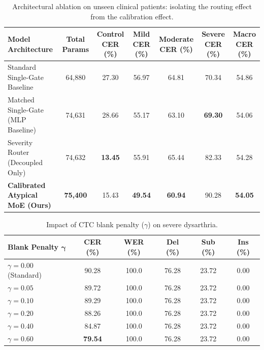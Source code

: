 \documentclass[10pt,twocolumn]{article}
\makeatletter
\newenvironment{adjustbox}[1]{%
  \begin{lrbox}{\@adjbox}%
}{%
  \end{lrbox}%
  \resizebox{\linewidth}{!}{\usebox{\@adjbox}}%
}
\makeatother
\begin{document}
\begin{table}[!t]
\centering
\caption{Architectural ablation on unseen clinical patients: isolating the routing effect from the calibration effect.}
\label{tab:arch_ablation}
\begin{adjustbox}{width=\textwidth}
\begin{tabular}{lcccccc}
\toprule
\textbf{Model Architecture} & \textbf{Total Params} & \textbf{Control CER (\%)} & \textbf{Mild CER (\%)} & \textbf{Moderate CER (\%)} & \textbf{Severe CER (\%)} & \textbf{Macro CER (\%)} \\
\midrule
Standard Single-Gate Baseline & 64,880 & 27.30 & 56.97 & 64.81 & 70.34 & 54.86 \\
Matched Single-Gate (MLP Baseline) & 74,631 & 28.66 & 55.17 & 63.10 & \textbf{69.30} & 54.06 \\
Severity Router (Decoupled Only) & 74,632 & \textbf{13.45} & 55.91 & 65.44 & 82.33 & 54.28 \\
\textbf{Calibrated Atypical MoE (Ours)} & \textbf{75,400} & 15.43 & \textbf{49.54} & \textbf{60.94} & 90.28 & \textbf{54.05} \\
\bottomrule
\end{tabular}
\end{adjustbox}
\end{table}

\begin{table}[!h]
\centering
\caption{Impact of CTC blank penalty ($\gamma$) on severe dysarthria.}
\label{tab:blank_penalty}
\begin{adjustbox}{width=\columnwidth}
\begin{tabular}{lccccc}
\toprule
\textbf{Blank Penalty $\bm{\gamma}$} & \textbf{CER (\%)} & \textbf{WER (\%)} & \textbf{Del (\%)} & \textbf{Sub (\%)} & \textbf{Ins (\%)} \\
\midrule
$\gamma = 0.00$ (Standard) & 90.28 & 100.0 & 76.28 & 23.72 & 0.00 \\
$\gamma = 0.05$ & 89.72 & 100.0 & 76.28 & 23.72 & 0.00 \\
$\gamma = 0.10$ & 89.29 & 100.0 & 76.28 & 23.72 & 0.00 \\
$\gamma = 0.20$ & 88.26 & 100.0 & 76.28 & 23.72 & 0.00 \\
$\gamma = 0.40$ & 84.87 & 100.0 & 76.28 & 23.72 & 0.00 \\
$\gamma = 0.60$ & \textbf{79.54} & 100.0 & 76.28 & 23.72 & 0.00 \\
\bottomrule
\end{tabular}
\end{adjustbox}
\end{table}
\end{document}
